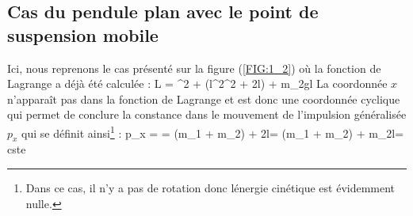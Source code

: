 \subsection{Cas du pendule plan avec le point de suspension mobile}

Ici, nous reprenons le cas pr\'esent\'e sur la figure (\ref{FIG:1_2}) o\`u la fonction de Lagrange a d\'ej\`a \'et\'e calcul\'ee :
\be
	L = ^{2} + \left(l^{2}\dot{\varphi}^{2} + 2l\cos\varphi{}\dot{\varphi}\right) + m_{2}gl\cos\varphi
\ee
La coordonn\'ee $x$ n'appara\^it pas dans la fonction de Lagrange et est donc une coordonn\'ee cyclique qui permet de conclure la constance dans le mouvement de l'impulsion g\'en\'eralis\'ee $p_{x}$ qui se d\'efinit ainsi\footnote{Dans ce cas, il n'y a pas de rotation donc l\'energie cin\'etique est \'evidemment nulle.} :
\be
	p_{x} =  = (m_{1} + m_{2}) + 2l\dot{\varphi}\cos\varphi = (m_{1} + m_{2}) + m_{2}l\dot{\varphi}\cos\varphi = cste
\ee

